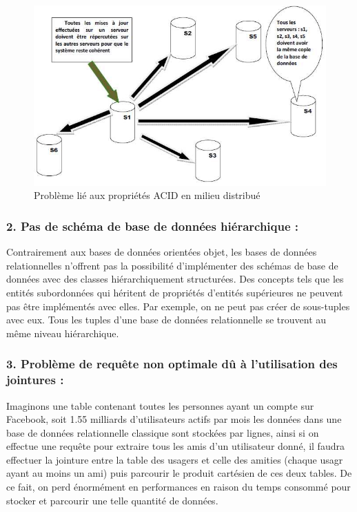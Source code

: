 \begin{figure}[h]
	\centering
    \includegraphics[scale=0.5]{img/4.0.2}
    \caption{Problème lié aux propriétés ACID en milieu distribué}
\end{figure}

\subsubsection{2. Pas de schéma de base de données hiérarchique :  }
Contrairement aux bases de données orientées objet, les bases de données relationnelles n'offrent pas la possibilité d'implémenter des schémas de base de données avec des classes hiérarchiquement structurées. Des concepts tels que les entités subordonnées qui héritent de propriétés d'entités supérieures ne peuvent pas être implémentés avec elles. Par exemple, on ne peut pas créer de sous-tuples avec eux. Tous les tuples d'une base de données relationnelle se trouvent au même niveau hiérarchique.

\subsubsection{3. Problème de requête non optimale dû à l’utilisation des jointures :}
Imaginons une table contenant toutes les personnes ayant un compte sur Facebook, soit 1.55 milliards d’utilisateurs actifs par mois les données dans une base de données relationnelle classique sont stockées par lignes, ainsi si on effectue une requête pour extraire tous les amis d’un utilisateur donné, il faudra effectuer la jointure entre la table des usagers et celle des amities (chaque usagr ayant au moins un ami) puis parcourir le produit cartésien de ces deux tables. De ce fait, on perd énormément en performances en raison du temps consommé pour stocker et parcourir une telle quantité de données.

